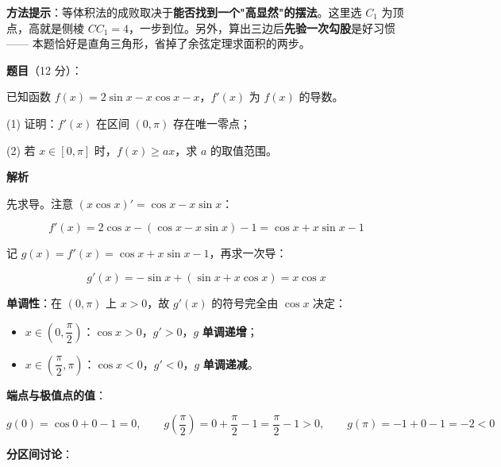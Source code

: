 \begin{answer}
\begin{gktip}
\textbf{方法提示}：等体积法的成败取决于\textbf{能否找到一个"高显然"的摆法}。这里选 $C_1$ 为顶点，高就是侧棱 $CC_1=4$，一步到位。另外，算出三边后\textbf{先验一次勾股}是好习惯 —— 本题恰好是直角三角形，省掉了余弦定理求面积的两步。
\end{gktip}



\par\medskip

\end{answer}
\begin{answer}

\textbf{题目}（12 分）：

已知函数 $f(x)=2\sin x-x\cos x-x$，$f'(x)$ 为 $f(x)$ 的导数。

  (1) 证明：$f'(x)$ 在区间 $(0,\pi)$ 存在唯一零点；

  (2) 若 $x\in[0,\pi]$ 时，$f(x)\ge ax$，求 $a$ 的取值范围。

\textbf{解析}


先求导。注意 $(x\cos x)'=\cos x-x\sin x$：

\nopagebreak[4]
\[f'(x)=2\cos x-(\cos x-x\sin x)-1=\cos x+x\sin x-1\]

记 $g(x)=f'(x)=\cos x+x\sin x-1$，再求一次导：

\nopagebreak[4]
\[g'(x)=-\sin x+(\sin x+x\cos x)=x\cos x\]

\textbf{单调性}：在 $(0,\pi)$ 上 $x>0$，故 $g'(x)$ 的符号完全由 $\cos x$ 决定：

\begin{itemize}
\item $x\in\left(0,\dfrac\pi2\right)$：$\cos x>0$，$g'>0$，$g$ \textbf{单调递增}；
\item $x\in\left(\dfrac\pi2,\pi\right)$：$\cos x<0$，$g'<0$，$g$ \textbf{单调递减}。
\end{itemize}

\textbf{端点与极值点的值}：

\nopagebreak[4]
\[g(0)=\cos0+0-1=0,\qquad g\!\left(\frac\pi2\right)=0+\frac\pi2-1=\frac\pi2-1>0,\qquad g(\pi)=-1+0-1=-2<0\]

\textbf{分区间讨论}：


\end{answer}
